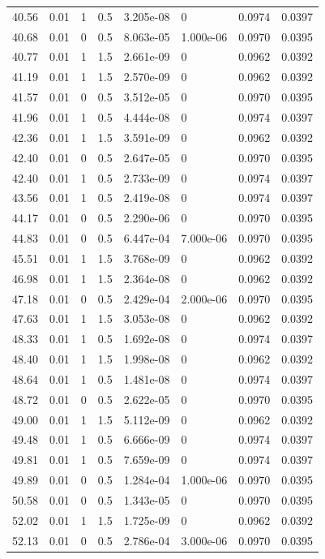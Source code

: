 \documentclass[preview]{standalone}
\begin{document}
{{{\begin{tabular}{L{1.2cm}C{1.2cm} C{0.3cm}C{0.5cm} C{1.4cm}C{1.4cm} C{1.4cm}C{1.4cm}}
  40.56  &  0.01  & 1     & 0.5 &  3.205e-08  & 0  & 0.0974 &  0.0397   \\ 
  40.68  &  0.01  & 0     & 0.5 &  8.063e-05  & 1.000e-06  & 0.0970 &  0.0395   \\ 
  40.77  &  0.01  & 1     & 1.5 &  2.661e-09  & 0  & 0.0962 &  0.0392   \\ 
  41.19  &  0.01  & 1     & 1.5 &  2.570e-09  & 0  & 0.0962 &  0.0392   \\ 
  41.57  &  0.01  & 0     & 0.5 &  3.512e-05  & 0  & 0.0970 &  0.0395   \\ 
  41.96  &  0.01  & 1     & 0.5 &  4.444e-08  & 0  & 0.0974 &  0.0397   \\ 
  42.36  &  0.01  & 1     & 1.5 &  3.591e-09  & 0  & 0.0962 &  0.0392   \\ 
  42.40  &  0.01  & 0     & 0.5 &  2.647e-05  & 0  & 0.0970 &  0.0395   \\ 
  42.40  &  0.01  & 1     & 0.5 &  2.733e-09  & 0  & 0.0974 &  0.0397   \\ 
  43.56  &  0.01  & 1     & 0.5 &  2.419e-08  & 0  & 0.0974 &  0.0397   \\ 
  44.17  &  0.01  & 0     & 0.5 &  2.290e-06  & 0  & 0.0970 &  0.0395   \\ 
  44.83  &  0.01  & 0     & 0.5 &  6.447e-04  & 7.000e-06  & 0.0970 &  0.0395   \\ 
  45.51  &  0.01  & 1     & 1.5 &  3.768e-09  & 0  & 0.0962 &  0.0392   \\ 
  46.98  &  0.01  & 1     & 1.5 &  2.364e-08  & 0  & 0.0962 &  0.0392   \\ 
  47.18  &  0.01  & 0     & 0.5 &  2.429e-04  & 2.000e-06  & 0.0970 &  0.0395   \\ 
  47.63  &  0.01  & 1     & 1.5 &  3.053e-08  & 0  & 0.0962 &  0.0392   \\ 
  48.33  &  0.01  & 1     & 0.5 &  1.692e-08  & 0  & 0.0974 &  0.0397   \\ 
  48.40  &  0.01  & 1     & 1.5 &  1.998e-08  & 0  & 0.0962 &  0.0392   \\ 
  48.64  &  0.01  & 1     & 0.5 &  1.481e-08  & 0  & 0.0974 &  0.0397   \\ 
  48.72  &  0.01  & 0     & 0.5 &  2.622e-05  & 0  & 0.0970 &  0.0395   \\ 
  49.00  &  0.01  & 1     & 1.5 &  5.112e-09  & 0  & 0.0962 &  0.0392   \\ 
  49.48  &  0.01  & 1     & 0.5 &  6.666e-09  & 0  & 0.0974 &  0.0397   \\ 
  49.81  &  0.01  & 1     & 0.5 &  7.659e-09  & 0  & 0.0974 &  0.0397   \\ 
  49.89  &  0.01  & 0     & 0.5 &  1.284e-04  & 1.000e-06  & 0.0970 &  0.0395   \\ 
  50.58  &  0.01  & 0     & 0.5 &  1.343e-05  & 0  & 0.0970 &  0.0395   \\ 
  52.02  &  0.01  & 1     & 1.5 &  1.725e-09  & 0  & 0.0962 &  0.0392   \\ 
  52.13  &  0.01  & 0     & 0.5 &  2.786e-04  & 3.000e-06  & 0.0970 &  0.0395   \\ 
\hline 
\end{tabular} 

}}}
\end{document}
